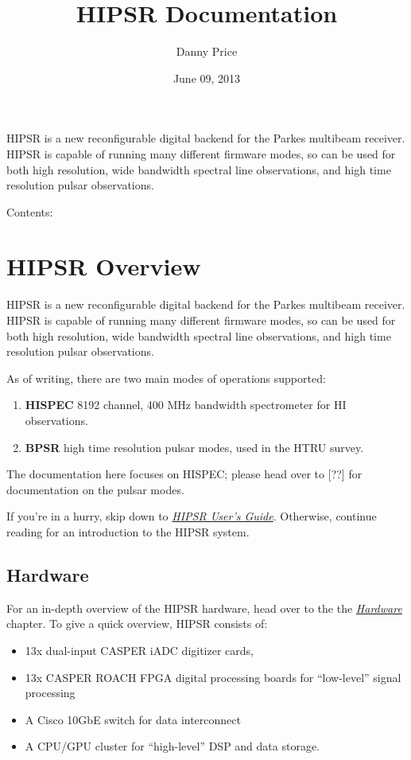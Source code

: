 \documentclass[letterpaper,10pt,english]{sphinxmanual}
\title{HIPSR Documentation}
\date{June 09, 2013}
\author{Danny Price}
\begin{document}
\maketitle
\tableofcontents
{}\label{index::doc}


HIPSR is a new reconfigurable digital backend for the Parkes multibeam receiver. HIPSR is capable of running many different firmware modes, so can be used for both high resolution, wide bandwidth spectral line observations, and high time resolution pulsar observations.

Contents:


\chapter{HIPSR Overview}
\label{overview:hipsr-hi-pulsar-signal-processor}\label{overview:hipsr-overview}\label{overview::doc}
HIPSR is a new reconfigurable digital backend for the Parkes multibeam receiver. HIPSR is capable of running many different firmware modes, so can be used for both high resolution, wide bandwidth spectral line observations, and high time resolution pulsar observations.

As of writing, there are two main modes of operations supported:
\begin{enumerate}
\item {} 
\textbf{HISPEC} 8192 channel, 400 MHz bandwidth spectrometer for HI observations.

\item {} 
\textbf{BPSR}   high time resolution pulsar modes, used in the HTRU survey.

\end{enumerate}

The documentation here focuses on HISPEC; please head over to {[}??{]} for documentation
on the pulsar modes.

If you're in a hurry, skip down to {\hyperref[user_guide:user-guide-chapter]{\emph{HIPSR User's Guide}}}. Otherwise, continue reading
for an introduction to the HIPSR system.


\section{Hardware}
\label{overview:hardware}
For an in-depth overview of the HIPSR hardware, head over to the
the {\hyperref[hardware:hardware-chapter]{\emph{Hardware}}} chapter. To give a quick overview, HIPSR consists of:
\begin{itemize}
\item {} 
13x dual-input CASPER iADC digitizer cards,

\item {} 
13x CASPER ROACH FPGA digital processing boards for ``low-level'' signal processing

\item {} 
A Cisco 10GbE switch for data interconnect

\item {} 
A CPU/GPU cluster for ``high-level'' DSP and data storage.

\end{itemize}
\end{document}

